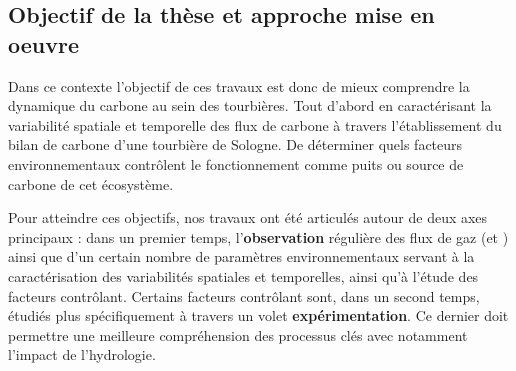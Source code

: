 %
%
%
%
%



\subsection*{Objectif de la thèse et approche mise en oeuvre}


Dans ce contexte l'objectif de ces travaux est donc de mieux comprendre la dynamique du carbone au sein des tourbières.
Tout d'abord en caractérisant la variabilité spatiale et temporelle des flux de carbone à travers l'établissement du bilan de carbone d'une tourbière de Sologne.
De déterminer quels facteurs environnementaux contrôlent le fonctionnement comme puits ou source de carbone de cet écosystème.

Pour atteindre ces objectifs, nos travaux ont été articulés autour de deux axes principaux :
dans un premier temps, l'\textbf{observation} régulière des flux de gaz (\coo et \chh) ainsi que d'un certain nombre de paramètres environnementaux servant à la caractérisation des variabilités spatiales et temporelles, ainsi qu'à l'étude des facteurs contrôlant.
Certains facteurs contrôlant sont, dans un second temps, étudiés plus spécifiquement à travers un volet \textbf{expérimentation}.
Ce dernier doit permettre une meilleure compréhension des processus clés avec notamment l'impact de l'hydrologie.


